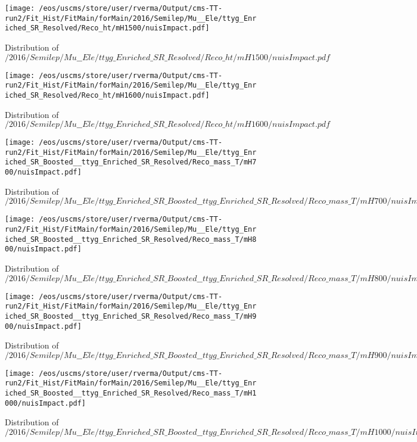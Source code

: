 \begin{figure}
\centering
\texttt{[image: /eos/uscms/store/user/rverma/Output/cms-TT-run2/Fit\_Hist/FitMain/forMain/2016/Semilep/Mu\_\_Ele/ttyg\_Enriched\_SR\_Resolved/Reco\_ht/mH1500/nuisImpact.pdf]}
\caption{Distribution of $/2016/Semilep/Mu\_\_Ele/ttyg\_Enriched\_SR\_Resolved/Reco\_ht/mH1500/nuisImpact.pdf$}
\end{figure}

\begin{figure}
\centering
\texttt{[image: /eos/uscms/store/user/rverma/Output/cms-TT-run2/Fit\_Hist/FitMain/forMain/2016/Semilep/Mu\_\_Ele/ttyg\_Enriched\_SR\_Resolved/Reco\_ht/mH1600/nuisImpact.pdf]}
\caption{Distribution of $/2016/Semilep/Mu\_\_Ele/ttyg\_Enriched\_SR\_Resolved/Reco\_ht/mH1600/nuisImpact.pdf$}
\end{figure}

\begin{figure}
\centering
\texttt{[image: /eos/uscms/store/user/rverma/Output/cms-TT-run2/Fit\_Hist/FitMain/forMain/2016/Semilep/Mu\_\_Ele/ttyg\_Enriched\_SR\_Boosted\_\_ttyg\_Enriched\_SR\_Resolved/Reco\_mass\_T/mH700/nuisImpact.pdf]}
\caption{Distribution of $/2016/Semilep/Mu\_\_Ele/ttyg\_Enriched\_SR\_Boosted\_\_ttyg\_Enriched\_SR\_Resolved/Reco\_mass\_T/mH700/nuisImpact.pdf$}
\end{figure}

\begin{figure}
\centering
\texttt{[image: /eos/uscms/store/user/rverma/Output/cms-TT-run2/Fit\_Hist/FitMain/forMain/2016/Semilep/Mu\_\_Ele/ttyg\_Enriched\_SR\_Boosted\_\_ttyg\_Enriched\_SR\_Resolved/Reco\_mass\_T/mH800/nuisImpact.pdf]}
\caption{Distribution of $/2016/Semilep/Mu\_\_Ele/ttyg\_Enriched\_SR\_Boosted\_\_ttyg\_Enriched\_SR\_Resolved/Reco\_mass\_T/mH800/nuisImpact.pdf$}
\end{figure}

\begin{figure}
\centering
\texttt{[image: /eos/uscms/store/user/rverma/Output/cms-TT-run2/Fit\_Hist/FitMain/forMain/2016/Semilep/Mu\_\_Ele/ttyg\_Enriched\_SR\_Boosted\_\_ttyg\_Enriched\_SR\_Resolved/Reco\_mass\_T/mH900/nuisImpact.pdf]}
\caption{Distribution of $/2016/Semilep/Mu\_\_Ele/ttyg\_Enriched\_SR\_Boosted\_\_ttyg\_Enriched\_SR\_Resolved/Reco\_mass\_T/mH900/nuisImpact.pdf$}
\end{figure}

\begin{figure}
\centering
\texttt{[image: /eos/uscms/store/user/rverma/Output/cms-TT-run2/Fit\_Hist/FitMain/forMain/2016/Semilep/Mu\_\_Ele/ttyg\_Enriched\_SR\_Boosted\_\_ttyg\_Enriched\_SR\_Resolved/Reco\_mass\_T/mH1000/nuisImpact.pdf]}
\caption{Distribution of $/2016/Semilep/Mu\_\_Ele/ttyg\_Enriched\_SR\_Boosted\_\_ttyg\_Enriched\_SR\_Resolved/Reco\_mass\_T/mH1000/nuisImpact.pdf$}
\end{figure}

